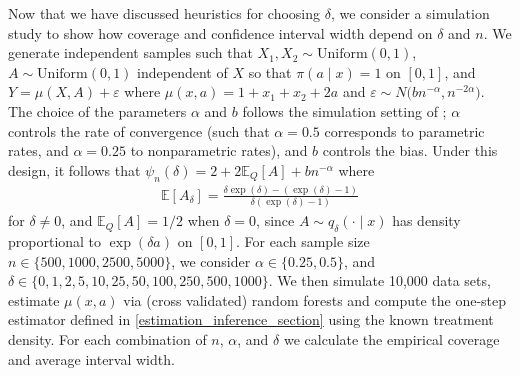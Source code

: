 \documentclass[11pt,twoside]{article}
\theoremstyle{definition}
\theoremstyle{remark}
\begin{document}
Now that we have discussed heuristics for choosing $\delta$, we consider a simulation study to show how coverage and confidence interval width depend on $\delta$ and $n$. We generate independent samples such that $X_1,X_2 \sim \mathrm{Uniform}(0,1)$, $A \sim \mathrm{Uniform}(0,1)$ independent of $X$ so that $\pi(a \mid x) = 1$ on $[0,1]$, and $Y = \mu(X,A) + \varepsilon$ where $\mu(x,a) = 1 + x_1 + x_2 + 2a$ and $\varepsilon \sim N\big(b n^{-\alpha}, n^{-2\alpha}\big)$. The choice of the parameters $\alpha$ and $b$ follows the simulation setting of \cite{rubio2024populationsizeestimationlists}; $\alpha$ controls the rate of convergence (such that $\alpha = 0.5$ corresponds to parametric rates, and $\alpha = 0.25$ to nonparametric rates), and $b$ controls the bias. Under this design, it follows that $\psi_n(\delta) = 2 + 2\mathbb{E}_Q[A] + b n^{-\alpha}$ where 
\begin{align*}
    \mathbb{E}[A_\delta] = \frac{\delta \exp(\delta) - (\exp(\delta) - 1)}{\delta (\exp(\delta) - 1)}
\end{align*}
for $\delta \neq 0$, and $\mathbb{E}_Q[A] = 1/2$ when $\delta = 0$, since $A \sim q_\delta( \cdot \mid x)$ has density proportional to $\exp(\delta a)$ on $[0, 1]$. For each sample size $n \in \{500, 1000, 2500, 5000\}$, we consider $\alpha \in \{0.25, 0.5\}$, and $\delta \in \{0, 1, 2, 5, 10, 25, 50, 100, 250, 500, 1000 \}$. We then simulate 10,000 data sets, estimate $\mu(x,a)$ via (cross validated) random forests and compute the one-step estimator defined in \cref{estimation_inference_section} using the known treatment density. For each combination of $n$, $\alpha$, and $\delta$ we calculate the empirical coverage and average interval width.
\end{document}
